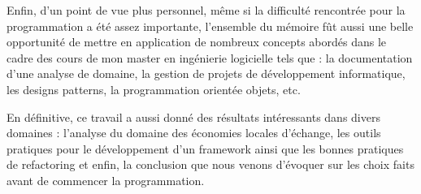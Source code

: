 Enfin,  d'un point de vue plus personnel,  même si la difficulté rencontrée pour la programmation a été assez importante,  l'ensemble du mémoire fût aussi une belle opportunité de mettre en application de nombreux concepts abordés dans le cadre des cours de mon master en ingénierie logicielle tels que : la documentation d'une analyse de domaine,  la gestion de projets de développement informatique,  les designs patterns,  la programmation orientée objets,  etc.

En définitive,  ce travail a aussi donné des résultats intéressants dans divers domaines : l'analyse du  domaine des économies locales d'échange,  les outils pratiques pour le développement d'un framework ainsi que les bonnes pratiques de refactoring et enfin,  la conclusion que nous venons d'évoquer sur les choix faits avant de commencer la programmation.  
